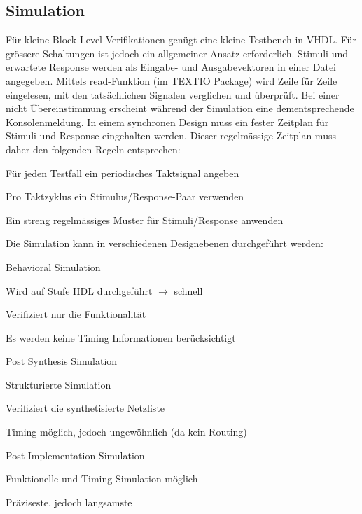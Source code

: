 \subsection{Simulation}
Für kleine Block Level Verifikationen genügt eine kleine Testbench in VHDL. Für grössere Schaltungen ist jedoch ein allgemeiner Ansatz erforderlich. Stimuli und erwartete Response werden als Eingabe- und Ausgabevektoren in einer Datei angegeben. Mittels read-Funktion (im TEXTIO Package) wird Zeile für Zeile eingelesen, mit den tatsächlichen Signalen verglichen und überprüft. Bei einer nicht Übereinstimmung erscheint während der Simulation eine dementsprechende Konsolenmeldung. In einem synchronen Design muss ein fester Zeitplan für Stimuli und Response eingehalten werden. Dieser regelmässige Zeitplan muss daher den folgenden Regeln entsprechen:
\begin{compactitem}
    \item Für jeden Testfall ein periodisches Taktsignal angeben
    \item Pro Taktzyklus ein Stimulus/Response-Paar verwenden
    \item Ein streng regelmässiges Muster für Stimuli/Response anwenden
\end{compactitem}

Die Simulation kann in verschiedenen Designebenen durchgeführt werden:
\begin{multicols}{3}
    \begin{compactitem}
        \item Behavioral Simulation
        \begin{compactitem}
            \item Wird auf Stufe HDL durchgeführt $\rightarrow$ schnell
            \item Verifiziert nur die Funktionalität
            \item Es werden keine Timing Informationen berücksichtigt
        \end{compactitem}
        \item Post Synthesis Simulation
        \begin{compactitem}
            \item Strukturierte Simulation
            \item Verifiziert die synthetisierte Netzliste
            \item Timing möglich, jedoch ungewöhnlich (da kein Routing) \ \\
        \end{compactitem}
        \item Post Implementation Simulation
        \begin{compactitem}
            \item Funktionelle und Timing Simulation möglich
            \item Präziseste, jedoch langsamste
        \end{compactitem} \ \\
    \end{compactitem}
\end{multicols}

